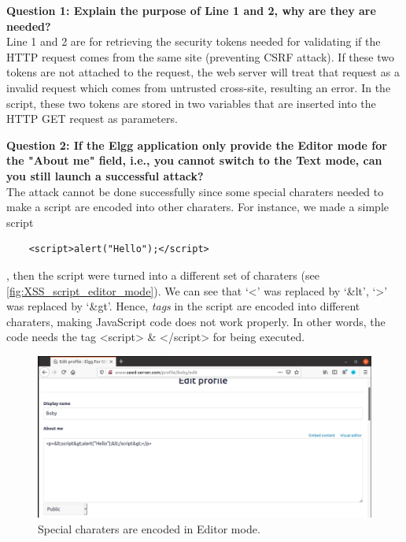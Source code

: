 \textbf{Question 1: Explain the purpose of Line 1 and 2, why are they are needed?}\\
Line 1 and 2 are for retrieving the security tokens needed for
validating if the HTTP request comes from the same site (preventing CSRF attack).
If these two tokens are not attached to the request, the web server will treat that
request as a invalid request which comes from untrusted cross-site, resulting an error.
In the script, these two tokens are stored in two variables that are inserted into the
HTTP GET request as parameters.

\textbf{Question 2: If the Elgg application only provide the Editor mode for the "About me"
field, i.e., you cannot switch to the Text mode, can you still launch a successful attack?}\\
The attack cannot be done successfully since some special charaters needed to make a script
are encoded into other charaters. For instance, we made a simple script

\begin{verbatim}
    <script>alert("Hello");</script>
\end{verbatim}

, then the script were turned into a different set of charaters
(see \autoref{fig:XSS_script_editor_mode}). We can see that `<' was replaced by `\&lt',
`>' was replaced by `\&gt'. Hence, \emph{tags} in the script are encoded into different
charaters, making JavaScript code does not work properly. In other words, the code needs
the tag <script> \& </script> for being executed. 


\begin{figure}[h]
    \centering
    \includegraphics[height=\textheight,width=\textwidth,keepaspectratio]
    {figures/script_edit_mode.png}
    \caption{Special charaters are encoded in Editor mode.}
    \label{fig:XSS_script_editor_mode}
\end{figure}